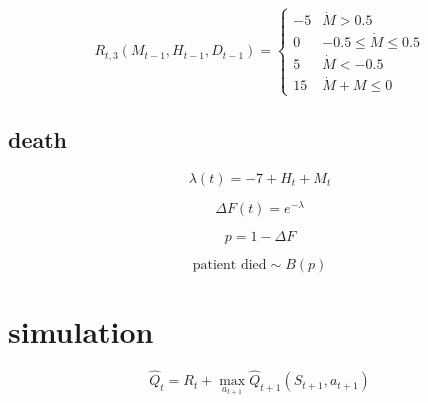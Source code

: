 \documentclass[12pt]{article}
\begin{document}
\[
R_{t, 3}(M_{t-1}, H_{t-1}, D_{t-1}) = 
\begin{cases}
  -5 & \dot{M} > 0.5 \\
  0 & -0.5 \leq \dot{M} \leq 0.5 \\
  5 & \dot{M} < -0.5 \\
  15 & \dot{M} + M \leq 0
\end{cases}
\]


\subsection{death} %
\label{sub:death}

\[
\lambda(t) = -7 + H_{t} + M_{t}
\]

\[
\Delta F(t) = e^{-\lambda}
\]

\[
p = 1 - \Delta F
\]

\[
\text{patient died} \sim B(p)
\]




\section{simulation} %
\label{sec:simulation}

\[
\hat{Q}_{t} = R_{t} + \max_{a_{t + 1}} \hat{Q}_{t+1}(S_{t+1}, a_{t+1})
\]



\end{document}
